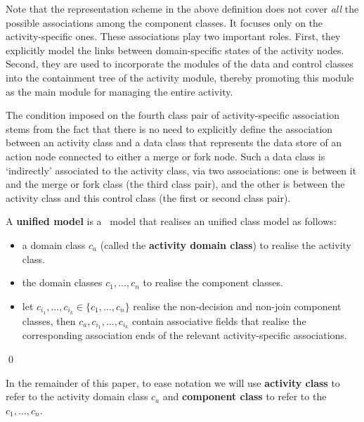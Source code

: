Note that the representation scheme in the above definition does not cover \textit{all} the possible associations among the component classes. It focuses only on the activity-specific ones. 
%
These associations play two important roles. First, they explicitly model the links between domain-specific states of the activity nodes. Second, they are used to incorporate the modules of the data and control classes into the containment tree of the activity module, thereby promoting this module as the main module for managing the entire activity.

The condition imposed on the fourth class pair of activity-specific association stems from the fact that there is no need to explicitly define the association between an activity class and a data class that represents the data store of an action node connected to either a merge or fork node. Such a data class is `indirectly' associated to the activity class, via two associations: one is between it and the merge or fork class (the third class pair), and the other is between the activity class and this control class (the first or second class pair).

\begin{definition} \label{def:unified-model}
	A \textbf{unified model} is a \dcsl~model that realises an unified class model as follows:
	\begin{itemize}%
		\item a domain class $ c_a $ (called the \textbf{activity domain class}) to realise the activity class.
		\item the domain classes $ c_1,\dots,c_n $ to realise the component classes.
		\item let $ c_{i_1},\dots,c_{i_k} \in \{c_1,\dots,c_n\} $ realise the non-decision and non-join component classes, then $ c_a,c_{i_1},\dots,c_{i_k} $ contain associative fields that realise the corresponding association ends of the relevant activity-specific associations.
	\end{itemize} \qed
\end{definition}

In the remainder of this paper, to ease notation we will use \textbf{activity class} to refer to the activity domain class $ c_a $ and \textbf{component class} to refer to the $ c_1,\dots,c_n $. 
%
